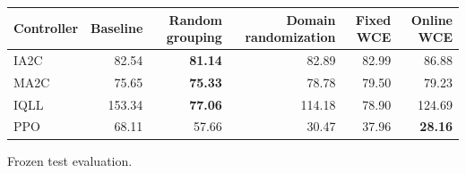 \begin{tabular}{lrrrrr}
\hline
Controller & Baseline & Random grouping & Domain randomization & Fixed WCE & Online WCE \\
\hline
IA2C & 82.54 & \textbf{81.14} & 82.89 & 82.99 & 86.88 \\
MA2C & 75.65 & \textbf{75.33} & 78.78 & 79.50 & 79.23 \\
IQLL & 153.34 & \textbf{77.06} & 114.18 & 78.90 & 124.69 \\
PPO & 68.11 & 57.66 & 30.47 & 37.96 & \textbf{28.16} \\
\hline
\end{tabular}
Frozen test evaluation.
